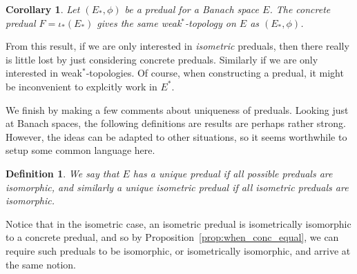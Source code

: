 \documentclass[a4paper,11pt]{article}
\theoremstyle{plain}
\newtheorem{corollary}[proposition]{Corollary}
\newtheorem{definition}[proposition]{Definition}
\theoremstyle{remark}
\begin{document}
\begin{corollary}\label{corr:pass_to_conc}
Let $(E_*, \phi)$ be a predual for a Banach space $E$.  The concrete predual $F = \iota_*(E_*)$ gives the same weak$^*$-topology on $E$ as $(E_*, \phi)$.
\end{corollary}

From this result, if we are only interested in \emph{isometric} preduals, then there really is little lost by just considering concrete preduals.  Similarly if we are only interested in weak$^*$-topologies.  Of course, when constructing a predual, it might be inconvenient to explcitly work in $E^*$.

We finish by making a few comments about uniqueness of preduals.  Looking just at Banach spaces, the following definitions are results are perhaps rather strong.  However, the ideas can be adapted to other situations, so it seems worthwhile to setup some common language here.

\begin{definition}
We say that $E$ has a \emph{unique predual} if all possible preduals are isomorphic, and similarly a \emph{unique isometric predual} if all isometric preduals are isomorphic.
\end{definition}

Notice that in the isometric case, an isometric predual is isometrically isomorphic to a concrete predual, and so by Proposition~\ref{prop:when_conc_equal}, we can require such preduals to be isomorphic, or isometrically isomorphic, and arrive at the same notion.
\end{document}
